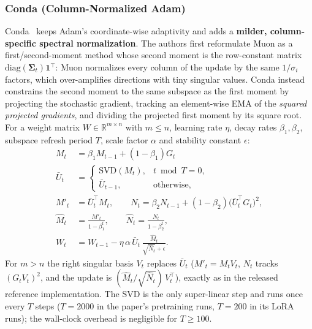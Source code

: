 \subsubsection{Conda (Column-Normalized Adam)}
Conda~\citep{wang_conda_2025} keeps Adam's coordinate-wise adaptivity and adds a
\textbf{milder, column-specific spectral normalization}. The authors first reformulate
Muon as a first/second-moment method whose second moment is the row-constant matrix
$\mathrm{diag}(\mathbf{\Sigma}_t)\mathbf{1}^\top$: Muon normalizes every column of the
update by the same $1/\sigma_i$ factors, which over-amplifies directions with tiny
singular values. Conda instead constrains the second moment to the same subspace as the
first moment by projecting the stochastic gradient, tracking an element-wise EMA of the
\emph{squared projected gradients}, and dividing the projected first moment by its square
root. For a weight matrix $W \in \mathbb{R}^{m \times n}$ with $m \le n$, learning rate
$\eta$, decay rates $\beta_1,\beta_2$, subspace refresh period $T$, scale factor $\alpha$
and stability constant $\epsilon$:
\begin{align}
M_t &= \beta_1 M_{t-1} + (1-\beta_1) G_t \\
\bar U_t &=
\begin{cases}
\mathrm{SVD}(M_t), & t \bmod T = 0, \\
\bar U_{t-1}, & \text{otherwise},
\end{cases} \\
M'_t &= \bar U_t^\top M_t, \qquad
N_t = \beta_2 N_{t-1} + (1-\beta_2)\big(\bar U_t^\top G_t\big)^2, \\
\widehat M_t &= \frac{M'_t}{1-\beta_1^t}, \qquad
\widehat N_t = \frac{N_t}{1-\beta_2^t}, \\
W_t &= W_{t-1} - \eta\,\alpha\,\bar U_t\,
      \frac{\widehat M_t}{\sqrt{\widehat N_t} + \epsilon}.
\end{align}
For $m > n$ the right singular basis $V_t$ replaces $\bar U_t$ ($M'_t = M_t V_t$, $N_t$
tracks $(G_t V_t)^2$, and the update is $(\widehat M_t/\sqrt{\widehat N_t})\,V_t^\top$),
exactly as in the released reference implementation. The SVD is the only super-linear
step and runs once every $T$ steps ($T=2000$ in the paper's pretraining runs, $T=200$ in
its LoRA runs); the wall-clock overhead is negligible for $T \ge 100$.


